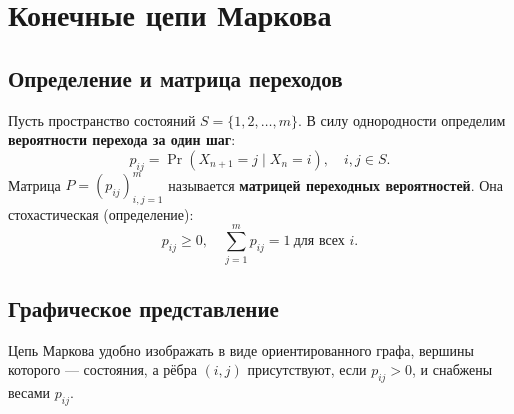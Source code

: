 \documentclass[10pt]{article}
\begin{document}
\section{Конечные цепи Маркова}

\subsection{Определение и матрица переходов}
Пусть пространство состояний $S = \{1,2,\dots,m\}$. В силу однородности определим \textbf{вероятности перехода за один шаг}:
\[
p_{ij} = \Pr(X_{n+1} = j \mid X_n = i), \quad i,j \in S.
\]
Матрица $P = (p_{ij})_{i,j=1}^m$ называется \textbf{матрицей переходных вероятностей}. Она стохастическая (определение):
\[
p_{ij} \ge 0, \quad \sum_{j=1}^m p_{ij} = 1 \ \text{для всех } i.
\]

\subsection{Графическое представление}
Цепь Маркова удобно изображать в виде ориентированного графа, вершины которого — состояния, а рёбра $(i,j)$ присутствуют, если $p_{ij} > 0$, и снабжены весами $p_{ij}$.
\end{document}
